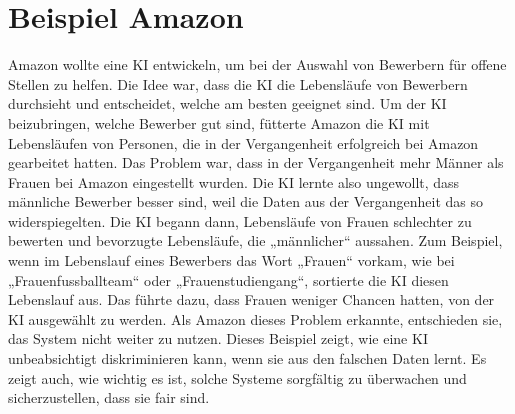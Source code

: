 \documentclass{article}
\begin{document}
\section{Beispiel Amazon}
Amazon wollte eine KI entwickeln, um bei der Auswahl von Bewerbern für offene Stellen zu helfen. Die Idee war, dass die KI die Lebensläufe von Bewerbern durchsieht und entscheidet, welche am besten geeignet sind. Um der KI beizubringen, welche Bewerber gut sind, fütterte Amazon die KI mit Lebensläufen von Personen, die in der Vergangenheit erfolgreich bei Amazon gearbeitet hatten. Das Problem war, dass in der Vergangenheit mehr Männer als Frauen bei Amazon eingestellt wurden. Die KI lernte also ungewollt, dass männliche Bewerber besser sind, weil die Daten aus der Vergangenheit das so widerspiegelten. Die KI begann dann, Lebensläufe von Frauen schlechter zu bewerten und bevorzugte Lebensläufe, die „männlicher“ aussahen. Zum Beispiel, wenn im Lebenslauf eines Bewerbers das Wort „Frauen“ vorkam, wie bei „Frauenfussballteam“ oder „Frauenstudiengang“, sortierte die KI diesen Lebenslauf aus. Das führte dazu, dass Frauen weniger Chancen hatten, von der KI ausgewählt zu werden. Als Amazon dieses Problem erkannte, entschieden sie, das System nicht weiter zu nutzen. Dieses Beispiel zeigt, wie eine KI unbeabsichtigt diskriminieren kann, wenn sie aus den falschen Daten lernt. Es zeigt auch, wie wichtig es ist, solche Systeme sorgfältig zu überwachen und sicherzustellen, dass sie fair sind.



\printbibliography
\end{document}
